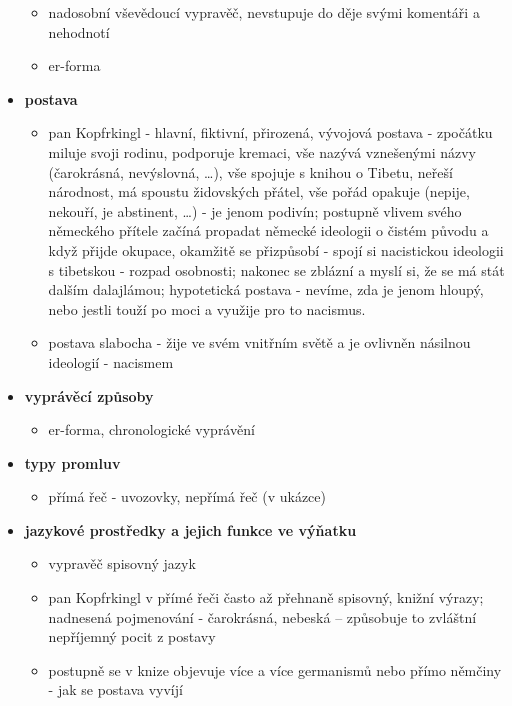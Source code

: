 \documentclass[11pt]{article}
\begin{document}
\begin{itemize}
        \begin{itemize}
            \item nadosobní vševědoucí vypravěč, nevstupuje do děje svými komentáři a nehodnotí
            \item er-forma
        \end{itemize}
        \item\textbf{postava}
        \begin{itemize}
            \item pan Kopfrkingl - hlavní, fiktivní, přirozená, vývojová postava - zpočátku miluje svoji rodinu, podporuje kremaci, vše nazývá vznešenými názvy (čarokrásná, nevýslovná, \dots), vše spojuje s knihou o Tibetu, neřeší národnost, má spoustu židovských přátel, vše pořád opakuje (nepije, nekouří, je abstinent, \dots) - je jenom podivín; postupně vlivem svého německého přítele začíná propadat německé ideologii o čistém původu a když přijde okupace, okamžitě se přizpůsobí - spojí si nacistickou ideologii s tibetskou - rozpad osobnosti; nakonec se zblázní a myslí si, že se má stát dalším dalajlámou; hypotetická postava - nevíme, zda je jenom hloupý, nebo jestli touží po moci a využije pro to nacismus.
            \item postava slabocha - žije ve svém vnitřním světě a je ovlivněn násilnou ideologií - nacismem
        \end{itemize}
        \item\textbf{vyprávěcí způsoby}
        \begin{itemize}
            \item er-forma, chronologické vyprávění
        \end{itemize}
        \item\textbf{typy promluv}
        \begin{itemize}
            \item přímá řeč - uvozovky, nepřímá řeč (v ukázce)
        \end{itemize}
        \item\textbf{jazykové prostředky a jejich funkce ve výňatku}
        \begin{itemize}
            \item vypravěč spisovný jazyk
            \item pan Kopfrkingl v přímé řeči často až přehnaně spisovný, knižní výrazy; nadnesená pojmenování - čarokrásná, nebeská -- způsobuje to zvláštní nepříjemný pocit z postavy
            \item postupně se v knize objevuje více a více germanismů nebo přímo němčiny - jak se postava vyvíjí

\end{itemize}
\end{itemize}
\end{document}
